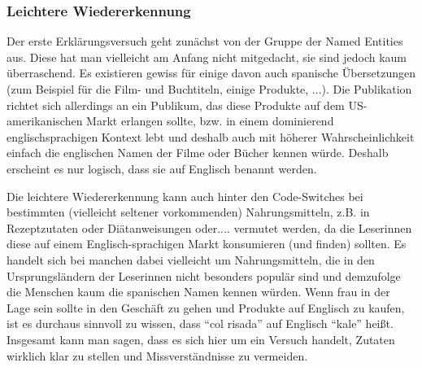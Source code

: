 \begin{comment}
Bei den Named Entities aber auch bei bestimmten andere Sachen, wie z.B. Rezeptzutaten
Hier kann man die Sozioindexikalität und die indexikalischen Felder wieder hervorrufen;
Zugehörigkeit auf verschiedenen Ebenen:
- Evokation(ist das ein Deutsches Wort?) einer bilinguale Identität/Komplizenschaft zwischen Herausgeberinnen und Leserinnen
- Zugehörigkeit zu einem hippen erfolgreichen Lifestyle (vlt geht das bereits auch in Prestige über?)


\end{comment}

\subsubsection{Leichtere Wiedererkennung}
Der erste Erklärungsversuch geht zunächst von der Gruppe der Named Entities aus.
Diese hat man vielleicht am Anfang nicht mitgedacht, sie sind jedoch kaum überraschend.
Es existieren gewiss für einige davon auch spanische Übersetzungen (zum Beispiel für die Film- und Buchtiteln, einige Produkte, ...).
Die Publikation richtet sich allerdings an ein Publikum, das diese Produkte auf dem US-amerikanischen Markt erlangen sollte, bzw. in einem dominierend englischsprachigen Kontext lebt und deshalb auch mit höherer Wahrscheinlichkeit einfach die englischen Namen der Filme oder Bücher kennen würde.
Deshalb erscheint es nur logisch, dass sie auf Englisch benannt werden.

Die leichtere Wiedererkennung kann auch hinter den Code-Switches bei bestimmten (vielleicht seltener vorkommenden) Nahrungsmitteln, z.B. in Rezeptzutaten oder Diätanweisungen oder.... vermutet werden, da die Leserinnen diese auf einem Englisch-sprachigen Markt konsumieren (und finden) sollten.
Es handelt sich bei manchen dabei vielleicht um Nahrungsmitteln, die in den Ursprungsländern der Leserinnen nicht besonders populär sind und demzufolge die Menschen kaum die spanischen Namen kennen würden.
Wenn frau in der Lage sein sollte in den Geschäft zu gehen und Produkte auf Englisch zu kaufen, ist es durchaus sinnvoll zu wissen, dass ``col risada'' auf Englisch ``kale'' heißt.
Insgesamt kann man sagen, dass es sich hier um ein Versuch handelt, Zutaten wirklich klar zu stellen und Missverständnisse zu vermeiden.


